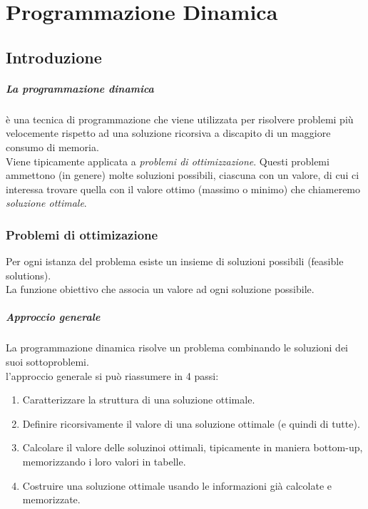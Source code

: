 \chapter{Programmazione Dinamica}
\section{Introduzione}
\paragraph{La programmazione dinamica} è una tecnica di programmazione che viene utilizzata per risolvere problemi più velocemente rispetto ad una soluzione ricorsiva a discapito di un maggiore consumo di memoria.
\\Viene tipicamente applicata a \emph{problemi di ottimizzazione}. Questi problemi ammettono (in genere) molte soluzioni possibili, ciascuna con un valore, di cui ci interessa trovare quella con il valore ottimo (massimo o minimo) che chiameremo \emph{soluzione ottimale}.
\subsection{Problemi di ottimizazione}
Per ogni istanza del problema esiste un insieme di soluzioni possibili (feasible solutions).\\
La funzione obiettivo che associa un valore ad ogni soluzione possibile.
\paragraph{Approccio generale}
La programmazione dinamica risolve un problema combinando le soluzioni dei suoi sottoproblemi.\\
l'approccio generale si può riassumere in 4 passi:
\begin{enumerate}
	\item Caratterizzare la struttura di una soluzione ottimale.
	\item Definire ricorsivamente il valore di una soluzione ottimale (e quindi di tutte).
	\item Calcolare il valore delle soluzinoi ottimali, tipicamente in maniera bottom-up,
	      memorizzando i loro valori in tabelle.
	\item Costruire una soluzione ottimale usando le informazioni già calcolate e memorizzate.
\end{enumerate}

